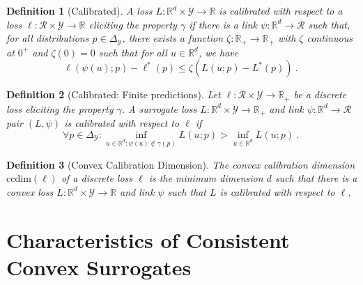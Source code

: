 \documentclass{article}
\newcommand{\reals}{\mathbb{R}}
\newcommand{\simplex}{\Delta_\Y}
\newcommand{\ccdim}{\mathrm{ccdim}}
\newcommand{\R}{\mathcal{R}}
\newcommand{\Y}{\mathcal{Y}}
\newcommand{\risk}[1]{#1^*}
\newtheorem{definition}{Definition}
\begin{document}
\begin{definition}[Calibrated]\label{def:calibrated-general}
	A loss $L:\reals^d \times \Y \to \reals$ is \emph{calibrated} with respect to a loss $\ell : \R \times \Y \to \reals$ eliciting the property $\gamma$ if there is a link $\psi : \reals^d \to \R$ such that, for all distributions $p \in \simplex$, there exists a function $\zeta : \reals_+ \to \reals_+$ with $\zeta$ continuous at $0^+$ and $\zeta(0) = 0$ such that for all $u \in \reals^d$, we have
	\begin{equation}\label{eq:calibrated-general}
	\ell( \psi(u); p) - \risk{\ell}(p)  \leq \zeta \left(  L(u;p) - \risk{L}(p) \right)~.~
	\end{equation}
\end{definition}
\begin{definition}[Calibrated: Finite predictions]\label{def:calibrated-finite}
	Let $\ell : \R \times \Y \to \reals_+$ be a discrete loss eliciting the property $\gamma$.
	A surrogate loss $L : \reals^d \times \Y \to \reals_+$  and link $\psi:\reals^d \to \R$ pair $(L, \psi)$ is \emph{calibrated} with respect to $\ell$ if 
	\begin{equation}\label{eq:calibration}
	\forall p \in \simplex: \inf_{u \in \reals^d : \psi(u) \not \in \gamma(p)} L(u;p) > \inf_{u \in \reals^d} L(u;p)~.~
	\end{equation}
\end{definition}

\begin{definition}[Convex Calibration Dimension]
The \emph{convex calibration dimension} $\ccdim(\ell)$ of a discrete loss $\ell$ is the minimum dimension $d$ such that there is a convex loss $L: \reals^d \times \Y \to \reals$ and link $\psi$ such that $L$ is calibrated with respect to $\ell$.
\end{definition}


\section{Characteristics of Consistent Convex Surrogates}\label{sec:char-convex}
\end{document}

